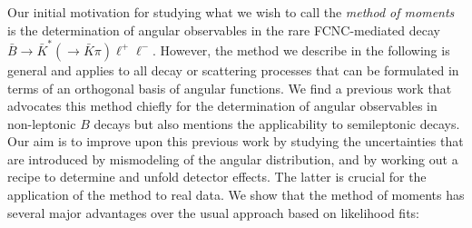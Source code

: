\documentclass[aps,nofootinbib,preprintnumbers,prd,twocolumn]{revtex4-1}
\begin{document}
Our initial motivation for studying what we wish to call the
\emph{method of moments} is the determination of angular observables
in the rare FCNC-mediated decay $\bar{B}\to \bar{K}^*(\to
\bar{K}\pi)\ell^+\ell^-$. However, the method we describe in the
following is general and applies to all decay or scattering
processes that can be formulated in terms of an orthogonal basis of angular functions.
We find a previous work \cite{Dighe:1998vk} that
advocates this method chiefly for the determination of angular
observables in non-leptonic $B$ decays but also mentions the
applicability to semileptonic decays. Our aim is to improve upon this
previous work by studying the uncertainties that are introduced by
mismodeling of the angular distribution, and by working out a recipe
to determine and unfold detector effects. The latter is crucial for
the application of the method to real data. We show that
the method of moments has several major advantages over the usual approach
based on likelihood fits:
\end{document}
